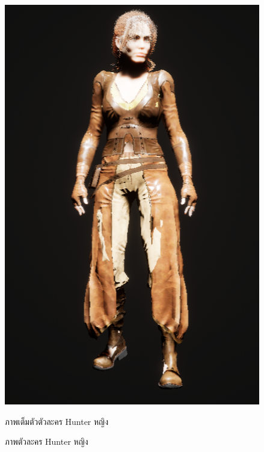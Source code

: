 \begin{figure}
\begin{subcaptionblock}{.4\textwidth}
    \includegraphics[width=.8\linewidth]{./img/characters/emma_full.png}
    \caption{ภาพเต็มตัวตัวละคร Hunter หญิง}\label{ภาพตัวเต็มตัวละคร Hunter หญิง}
  \end{subcaptionblock}%
  \caption{ภาพตัวละคร Hunter หญิง}\label{fig:emma}
\end{figure}

